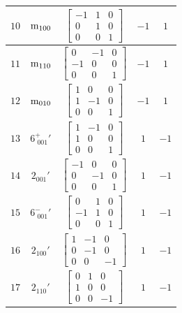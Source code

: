 \documentclass[fleqn,8pt]{jsarticle}
\begin{document}
\begin{longtable}{ccccc}
$ 10 $ & $ {\rm m}_{100} $ & $ \begin{bmatrix} -1 & 1 & 0 \\ 0 & 1 & 0 \\ 0 & 0 & 1 \end{bmatrix} $ & $ -1 $ & $ 1 $ \\ \hline
$ 11 $ & $ {\rm m}_{110} $ & $ \begin{bmatrix} 0 & -1 & 0 \\ -1 & 0 & 0 \\ 0 & 0 & 1 \end{bmatrix} $ & $ -1 $ & $ 1 $ \\ \hline
$ 12 $ & $ {\rm m}_{010} $ & $ \begin{bmatrix} 1 & 0 & 0 \\ 1 & -1 & 0 \\ 0 & 0 & 1 \end{bmatrix} $ & $ -1 $ & $ 1 $ \\ \hline
$ 13 $ & $ 6^{+}_{\,\,001}{}' $ & $ \begin{bmatrix} 1 & -1 & 0 \\ 1 & 0 & 0 \\ 0 & 0 & 1 \end{bmatrix} $ & $ 1 $ & $ -1 $ \\ \hline
$ 14 $ & $ 2{}_{001}{}' $ & $ \begin{bmatrix} -1 & 0 & 0 \\ 0 & -1 & 0 \\ 0 & 0 & 1 \end{bmatrix} $ & $ 1 $ & $ -1 $ \\ \hline
$ 15 $ & $ 6^{-}_{\,\,001}{}' $ & $ \begin{bmatrix} 0 & 1 & 0 \\ -1 & 1 & 0 \\ 0 & 0 & 1 \end{bmatrix} $ & $ 1 $ & $ -1 $ \\ \hline
$ 16 $ & $ 2{}_{100}{}' $ & $ \begin{bmatrix} 1 & -1 & 0 \\ 0 & -1 & 0 \\ 0 & 0 & -1 \end{bmatrix} $ & $ 1 $ & $ -1 $ \\ \hline
$ 17 $ & $ 2{}_{110}{}' $ & $ \begin{bmatrix} 0 & 1 & 0 \\ 1 & 0 & 0 \\ 0 & 0 & -1 \end{bmatrix} $ & $ 1 $ & $ -1 $ \\ \hline

\end{longtable}
\end{document}
